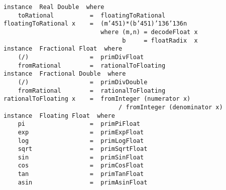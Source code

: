 \mbox{\tt instance\ \ Real\ Double\ \ where}\\
\mbox{\tt \ \ \ \ toRational\ \ \ \ \ \ \ \ \ \ =\ \ floatingToRational}
%
\eprogB\noindent\bprogB
\mbox{\tt floatingToRational\ x\ \ \ \ =\ \ (m{\char'45}1)*(b{\char'45}1){\char'136}{\char'136}n}\\
\mbox{\tt \ \ \ \ \ \ \ \ \ \ \ \ \ \ \ \ \ \ \ \ \ \ \ \ \ \ \ where\ (m,n)\ =\ decodeFloat\ x}\\
\mbox{\tt \ \ \ \ \ \ \ \ \ \ \ \ \ \ \ \ \ \ \ \ \ \ \ \ \ \ \ \ \ \ \ \ \ b\ \ \ \ \ =\ floatRadix\ \ x}
\eprogB\noindent\bprogB
\mbox{\tt instance\ \ Fractional\ Float\ \ where}\\
\mbox{\tt \ \ \ \ (/)\ \ \ \ \ \ \ \ \ \ \ \ \ \ \ \ \ =\ \ primDivFloat}\\
\mbox{\tt \ \ \ \ fromRational\ \ \ \ \ \ \ \ =\ \ rationalToFloating}
%
\eprogB\noindent\bprogB
\mbox{\tt instance\ \ Fractional\ Double\ \ where}\\
\mbox{\tt \ \ \ \ (/)\ \ \ \ \ \ \ \ \ \ \ \ \ \ \ \ \ =\ \ primDivDouble}\\
\mbox{\tt \ \ \ \ fromRational\ \ \ \ \ \ \ \ =\ \ rationalToFloating}
%
\eprogB\noindent\bprogB
\mbox{\tt rationalToFloating\ x\ \ \ \ =\ \ fromInteger\ (numerator\ x)}\\
\mbox{\tt \ \ \ \ \ \ \ \ \ \ \ \ \ \ \ \ \ \ \ \ \ \ \ \ \ \ \ \ \ \ \ \ /\ fromInteger\ (denominator\ x)}
\eprogB\noindent\bprogB
\mbox{\tt instance\ \ Floating\ Float\ \ where}\\
\mbox{\tt \ \ \ \ pi\ \ \ \ \ \ \ \ \ \ \ \ \ \ \ \ \ \ =\ \ primPiFloat}\\
\mbox{\tt \ \ \ \ exp\ \ \ \ \ \ \ \ \ \ \ \ \ \ \ \ \ =\ \ primExpFloat}\\
\mbox{\tt \ \ \ \ log\ \ \ \ \ \ \ \ \ \ \ \ \ \ \ \ \ =\ \ primLogFloat}\\
\mbox{\tt \ \ \ \ sqrt\ \ \ \ \ \ \ \ \ \ \ \ \ \ \ \ =\ \ primSqrtFloat}\\
\mbox{\tt \ \ \ \ sin\ \ \ \ \ \ \ \ \ \ \ \ \ \ \ \ \ =\ \ primSinFloat}\\
\mbox{\tt \ \ \ \ cos\ \ \ \ \ \ \ \ \ \ \ \ \ \ \ \ \ =\ \ primCosFloat}\\
\mbox{\tt \ \ \ \ tan\ \ \ \ \ \ \ \ \ \ \ \ \ \ \ \ \ =\ \ primTanFloat}\\
\mbox{\tt \ \ \ \ asin\ \ \ \ \ \ \ \ \ \ \ \ \ \ \ \ =\ \ primAsinFloat}\\
